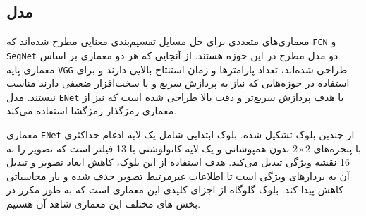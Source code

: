 \subsection{مدل }

معماری‌های متعددی برای حل مسایل تقسیم‌بندی معنایی مطرح شده‌اند که
\verb*|FCN|
و
\verb*|SegNet|
\cite{badrinarayanan2017segnet}
دو مدل مطرح در این حوزه هستند. از آنجایی که هر دو معماری بر اساس معماری پایه
\verb*|VGG|
طراحی شده‌اند، تعداد پارامتر‌ها و زمان استنتاج بالایی دارند و برای استفاده در حوزه‌هایی که نیاز به پردازش سریع و یا سخت‌افزار ضعیفی دارند مناسب نیستند. مدل
\verb*|ENet|
\cite{paszke2016enet}
با هدف پردازش سریع‌تر و دقت بالا طراحی شده است که نیز از معماری رمزگذار-رمزگشا استفاده می‌کند. 

معماری
\verb*|ENet|
از چندین بلوک تشکیل شده. بلوک ابتدایی
شامل یک لایه ادغام حداکثری با پنجره‌‌های 2×2 بدون همپوشانی و یک لایه کانولوشنی با 13 فیلتر است که تصویر را به 16 نقشه ویژگی تبدیل می‌کند. هدف استفاده از این بلوک، کاهش ابعاد تصویر و تبدیل آن به بردار‌های ویژگی است تا اطلاعات غیرمرتبط تصویر حذف شده و بار محاسباتی کاهش پیدا کند. بلوک گلوگاه از اجزای کلیدی این معماری است که به طور مکرر در بخش های مختلف این معماری شاهد آن هستیم.

